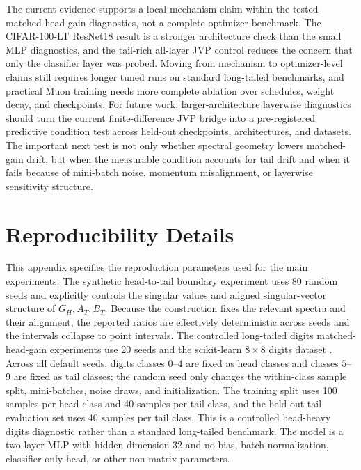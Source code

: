 \documentclass{article}
\theoremstyle{definition}
\begin{document}
The current evidence supports a local mechanism claim within the tested matched-head-gain diagnostics, not a complete optimizer benchmark. The CIFAR-100-LT ResNet18 result is a stronger architecture check than the small MLP diagnostics, and the tail-rich all-layer JVP control reduces the concern that only the classifier layer was probed. Moving from mechanism to optimizer-level claims still requires longer tuned runs on standard long-tailed benchmarks, and practical Muon training needs more complete ablation over schedules, weight decay, and checkpoints. For future work, larger-architecture layerwise diagnostics should turn the current finite-difference JVP bridge into a pre-registered predictive condition test across held-out checkpoints, architectures, and datasets. The important next test is not only whether spectral geometry lowers matched-gain drift, but when the measurable condition accounts for tail drift and when it fails because of mini-batch noise, momentum misalignment, or layerwise sensitivity structure.

\section{Reproducibility Details}
\label{app:repro}

This appendix specifies the reproduction parameters used for the main experiments. The synthetic head-to-tail boundary experiment uses 80 random seeds and explicitly controls the singular values and aligned singular-vector structure of \(G_H,A_T,B_T\). Because the construction fixes the relevant spectra and their alignment, the reported ratios are effectively deterministic across seeds and the intervals collapse to point intervals. The controlled long-tailed digits matched-head-gain experiments use 20 seeds and the scikit-learn \(8\times 8\) digits dataset \citep{pedregosa2011scikit}. Across all default seeds, digits classes \(0\)--\(4\) are fixed as head classes and classes \(5\)--\(9\) are fixed as tail classes; the random seed only changes the within-class sample split, mini-batches, noise draws, and initialization. The training split uses 100 samples per head class and 40 samples per tail class, and the held-out tail evaluation set uses 40 samples per tail class. This is a controlled head-heavy digits diagnostic rather than a standard long-tailed benchmark. The model is a two-layer MLP with hidden dimension 32 and no bias, batch-normalization, classifier-only head, or other non-matrix parameters.
\end{document}
